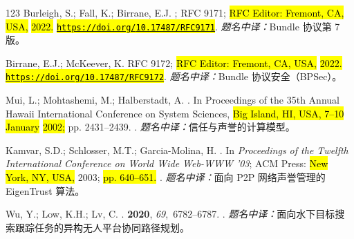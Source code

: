 \begin{thebibliography}{123}
Burleigh, S.; Fall, K.; Birrane, E.J.
; RFC 9171; \hl{RFC Editor: Fremont, CA, USA,} \hl{2022.} \newblock \href{https://doi.org/10.17487/RFC9171}{\hl{\mbox{\nolinkurl{https://doi.org/}}}}\allowbreak\href{https://doi.org/10.17487/RFC9171}{\hl{\mbox{\nolinkurl{10.17487/}}}}\allowbreak\href{https://doi.org/10.17487/RFC9171}{\hl{\mbox{\nolinkurl{RFC9171}}}}.
\newblock \textit{题名中译：}Bundle 协议第 7 版。

Birrane, E.J.; McKeever, K.
 RFC 9172; \hl{RFC Editor: Fremont, CA, USA,} \hl{2022.} \newblock \href{https://doi.org/10.17487/RFC9172}{\hl{\mbox{\nolinkurl{https://doi.org/}}}}\allowbreak\href{https://doi.org/10.17487/RFC9172}{\hl{\mbox{\nolinkurl{10.17487/}}}}\allowbreak\href{https://doi.org/10.17487/RFC9172}{\hl{\mbox{\nolinkurl{RFC9172}}}}.
\newblock \textit{题名中译：}Bundle 协议安全（BPSec）。

Mui, L.; Mohtashemi, M.; Halberstadt, A.
.
\newblock In Proceedings of the 35th Annual Hawaii International Conference on
  System Sciences, \hl{Big Island, HI, USA,  7–10 January} \hl{2002;}  pp. 2431--2439.
.
\newblock \textit{题名中译：}信任与声誉的计算模型。

Kamvar, S.D.; Schlosser, M.T.; Garcia-Molina, H.
.
\newblock In \emph{Proceedings of the Twelfth International Conference on World Wide
  Web-WWW '03}; ACM Press:  \hl{New York, NY, USA,} 2003; \hl{pp. 640--651.}
.
\newblock \textit{题名中译：}面向 P2P 网络声誉管理的 EigenTrust 算法。

Wu, Y.; Low, K.H.; Lv, C.
.
 {\bf 2020}, {\em
  69},~6782--6787.
.
\newblock \textit{题名中译：}面向水下目标搜索跟踪任务的异构无人平台协同路径规划。


\end{thebibliography}
